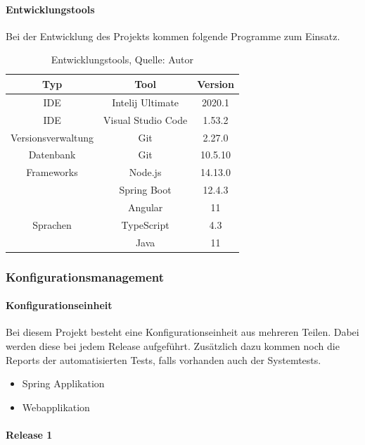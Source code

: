 \paragraph{Entwicklungstools}
Bei der Entwicklung des Projekts kommen folgende Programme zum Einsatz. 

\begin{table}[H]
\setlength\extrarowheight{2pt} %
\begin{tabularx}{\textwidth}{|C|C|C|}
\hline
\textbf{Typ} &\textbf{Tool} & \textbf{Version}  \\

\hline
IDE & Intelij Ultimate  & 2020.1\\
\hline
IDE & Visual Studio Code & 1.53.2\\ 
\hline
Versionsverwaltung & Git & 2.27.0\\
\hline
Datenbank & Git & 10.5.10 \\
\hline
Frameworks & Node.js & 14.13.0 \\
\hline
 & Spring Boot & 12.4.3 \\
 \hline
 & Angular & 11 \\
 \hline
Sprachen & TypeScript& 4.3 \\
\hline
& Java& 11 \\
\hline
\end{tabularx}
\caption{ \label{tbl: Entwicklungstools}Entwicklungstools, Quelle: Autor}
\end{table}
\subsubsection{Konfigurationsmanagement}
\paragraph{Konfigurationseinheit}

Bei diesem Projekt besteht eine Konfigurationseinheit aus mehreren Teilen. Dabei werden diese bei jedem Release aufgeführt. Zusätzlich dazu kommen noch die Reports der automatisierten Tests, falls vorhanden auch der Systemtests.
\begin{itemize}
\item Spring Applikation
\item Webapplikation
\end{itemize}
\paragraph{Release 1}

